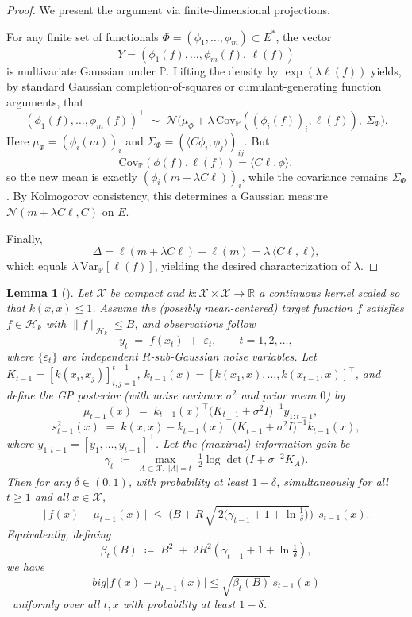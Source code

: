 \documentclass{article} %
\newtheorem{lemma}{Lemma}
\begin{document}
\begin{proof}
We present the argument via finite-dimensional projections.

For any finite set of functionals $\Phi=(\phi_1,\dots,\phi_m)\subset E^*$, the vector
\[
Y=(\phi_1(f),\dots,\phi_m(f),\,\ell(f))
\]
is multivariate Gaussian under $\mathbb P$.  
Lifting the density by $\exp(\lambda \ell(f))$ yields, by standard Gaussian completion-of-squares or cumulant-generating function arguments, that
\[
(\phi_1(f),\dots,\phi_m(f))^\top \;\sim\; 
\mathcal N\!\big( \mu_\Phi + \lambda\,\mathrm{Cov}_\mathbb P((\phi_i(f))_i,\ell(f)),\ \Sigma_\Phi \big).
\]
Here $\mu_\Phi=(\phi_i(m))_i$ and $\Sigma_\Phi=(\langle C\phi_i,\phi_j\rangle)_{ij}$.  
But
\[
\mathrm{Cov}_\mathbb P(\phi(f),\ell(f))=\langle C\ell,\phi\rangle,
\]
so the new mean is exactly $(\phi_i(m+\lambda C\ell))_i$, while the covariance remains $\Sigma_\Phi$.  
By Kolmogorov consistency, this determines a Gaussian measure $\mathcal N(m+\lambda C\ell, C)$ on $E$.  

Finally,
\[
\Delta=\ell(m+\lambda C\ell)-\ell(m)
=\lambda\,\langle C\ell,\ell\rangle,
\]
which equals $\lambda\,\mathrm{Var}_\mathbb P[\ell(f)]$, yielding the desired characterization of $\lambda$.
\end{proof}
\begin{lemma}[{\cite[Theorem~2]{chowdhury2017kernelized}}]\label{lem:rkhs_ucb}
Let $\mathcal X$ be compact and $k:\mathcal X\times\mathcal X\to\mathbb R$ a continuous kernel scaled so that $k(x,x)\le 1$. 
Assume the (possibly mean-centered) target function $f$ satisfies $f\in\mathcal H_k$ with $\|f\|_{\mathcal H_k}\le B$, and observations follow
\[
y_t \;=\; f(x_t)\;+\;\varepsilon_t,\qquad t=1,2,\ldots,
\]
where $\{\varepsilon_t\}$ are independent $R$-sub-Gaussian noise variables. 
Let $K_{t-1}=[k(x_i,x_j)]_{i,j=1}^{t-1}$, $k_{t-1}(x)=[k(x_1,x),\ldots,k(x_{t-1},x)]^\top$, and define the GP posterior (with noise variance $\sigma^2$ and prior mean $0$) by
\[
\mu_{t-1}(x)\;=\;k_{t-1}(x)^\top\!\big(K_{t-1}+\sigma^2 I\big)^{-1}\!y_{1:t-1},
\quad\]
\[
s_{t-1}^2(x)\;=\;k(x,x)-k_{t-1}(x)^\top\!\big(K_{t-1}+\sigma^2 I\big)^{-1}\!k_{t-1}(x),
\]
where $y_{1:t-1}=[y_1,\dots,y_{t-1}]^\top$. 
Let the (maximal) information gain be
\[
\gamma_t \;\coloneqq\; \max_{A\subset\mathcal X,\;|A|=t}\; \tfrac12\log\det\!\big(I+\sigma^{-2}K_A\big).
\]
Then for any $\delta\in(0,1)$, with probability at least $1-\delta$, simultaneously for all $t\ge 1$ and all $x\in\mathcal X$,
\[
\big|\,f(x)-\mu_{t-1}(x)\,\big|
\;\le\;
\Big(B + R\,\sqrt{\,2\big(\gamma_{t-1}+1+\ln\tfrac1\delta\big)}\Big)\;\, s_{t-1}(x).
\]
Equivalently, defining
\[
\beta_t(B)\;\coloneqq\; B^2 \;+\; 2R^2\!\left(\gamma_{t-1}+1+\ln\tfrac1\delta\right),
\]
we have 
\begin{equation}\label{equ:lem1}
    big|f(x)-\mu_{t-1}(x)\big|\le \sqrt{\beta_t(B)}\,s_{t-1}(x)
\end{equation}\ uniformly over all $t,x$ with probability at least $1-\delta$.
\end{lemma}
\end{document}
